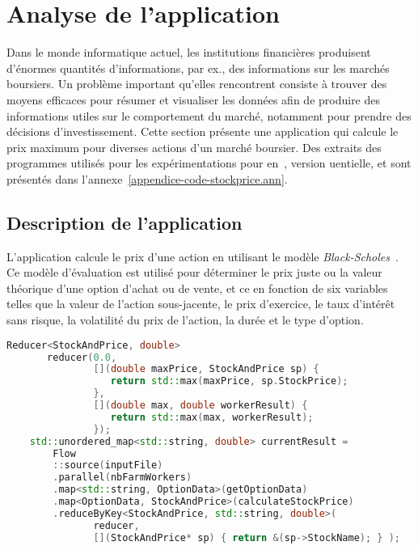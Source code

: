 


\section{Analyse de l'application }
\label{stockprice.sect}

Dans le monde informatique actuel, les institutions financi\`eres produisent d'\'enormes quantit\'es d'informations, par ex., des informations sur les march\'es boursiers. Un probl\`eme important qu'elles rencontrent consiste \`a trouver des moyens efficaces pour r\'esumer et visualiser les donn\'ees afin de produire des informations utiles sur le comportement du march\'e, notamment pour prendre des d\'ecisions d'investissement. Cette section pr\'esente une application qui calcule le prix maximum pour diverses actions d'un marché boursier. Des extraits des programmes utilis\'es pour les exp\'erimentations pour  en~,  version uentielle,  et  sont pr\'esent\'es dans l'annexe~\ref{appendice-code-stockprice.ann}.


\subsection{Description de l'application}

L'application  calcule le prix d'une action en utilisant le modèle \emph{Black-Scholes}~\citep{macbeth1979empirical}. Ce mod\`ele d'\'evaluation est utilis\'e pour d\'eterminer le prix juste ou la valeur th\'eorique d'une option d'achat ou de vente, et ce en fonction de six variables telles que la valeur de l'action sous-jacente, le prix d'exercice, le taux d'int\'er\^et sans risque, la volatilit\'e du prix de l'action, la dur\'ee et le type d'option. 

\begin{lstlisting}[float,label={StockPrice-code.listing},gobble=4,basicstyle=\ttfamily\footnotesize,language=c++,caption={Extrait du code de \TT{StockPrice.cpp} (version \ppff).},frame=single]
    Reducer<StockAndPrice, double>
       reducer(0.0, 
               [](double maxPrice, StockAndPrice sp) {
                  return std::max(maxPrice, sp.StockPrice);
               },
               [](double max, double workerResult) { 
                  return std::max(max, workerResult);
               });
    std::unordered_map<std::string, double> currentResult =
        Flow
        ::source(inputFile)
        .parallel(nbFarmWorkers)
        .map<std::string, OptionData>(getOptionData)
        .map<OptionData, StockAndPrice>(calculateStockPrice)
        .reduceByKey<StockAndPrice, std::string, double>(
               reducer, 
               [](StockAndPrice* sp) { return &(sp->StockName); } );
\end{lstlisting}


